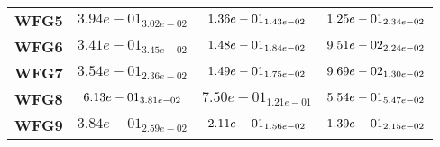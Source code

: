 \documentclass{article}
\begin{document}
\begin{table}[!htp]
\begin{scriptsize}
\begin{tabular}{c|ccc}
      \textbf{WFG5} & $3.94e-01_{3.02e-02} $ & $ \cellcolor{gray25} 1.36e-01_{1.43e-02} $ & $ \cellcolor{gray95} 1.25e-01_{2.34e-02}$ \\
      \textbf{WFG6} & $3.41e-01_{3.45e-02} $ & $ \cellcolor{gray25} 1.48e-01_{1.84e-02} $ & $ \cellcolor{gray95} 9.51e-02_{2.24e-02}$ \\
      \textbf{WFG7} & $3.54e-01_{2.36e-02} $ & $ \cellcolor{gray25} 1.49e-01_{1.75e-02} $ & $ \cellcolor{gray95} 9.69e-02_{1.30e-02}$ \\
      \textbf{WFG8} & $\cellcolor{gray25} 6.13e-01_{3.81e-02} $ & $ 7.50e-01_{1.21e-01} $ & $ \cellcolor{gray95} 5.54e-01_{5.47e-02}$ \\
      \textbf{WFG9} & $3.84e-01_{2.59e-02} $ & $ \cellcolor{gray25} 2.11e-01_{1.56e-02} $ & $ \cellcolor{gray95} 1.39e-01_{2.15e-02}$ \\
  \end{tabular}
  \end{scriptsize}
\end{table}
\end{document}
